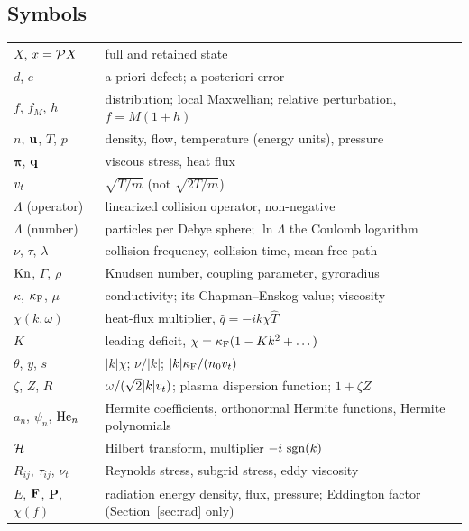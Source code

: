 \subsection{Symbols}

\begin{center}
\renewcommand{\arraystretch}{1.15}
\begin{tabularx}{\textwidth}{@{}P{2.6cm}Y@{}}
\toprule
$X$, $x=\mathcal{P} X$ & full and retained state \\
$d$, $e$ & a priori defect; a posteriori error \\
$f$, $f_M$, $h$ & distribution; local Maxwellian; relative perturbation,
   $f=M(1+h)$ \\
$n$, $\mathbf{u}$, $T$, $p$ & density, flow, temperature (energy units), pressure \\
$\boldsymbol\pi$, $\mathbf{q}$ & viscous stress, heat flux \\
$v_t$ & $\sqrt{T/m}$ (not $\sqrt{2T/m}$) \\
$\Lambda$ (operator) & linearized collision operator, non-negative \\
$\Lambda$ (number) & particles per Debye sphere; $\ln\Lambda$ the Coulomb
   logarithm \\
$\nu$, $\tau$, $\lambda$ & collision frequency, collision time, mean free
   path \\
$\mathrm{Kn}$, $\Gamma$, $\rho$ & Knudsen number, coupling parameter, gyroradius \\
$\kappa$, $\kappa_{\mathrm F}$, $\mu$ & conductivity; its Chapman--Enskog value;
   viscosity \\
$\chi(k,\omega)$ & heat-flux multiplier, $\hat q=-ik\chi\hat T$ \\
$K$ & leading deficit, $\chi=\kappa_{\mathrm F}(1-Kk^2+\dots)$ \\
$\theta$, $y$, $s$ & $|k|\chi$; $\nu/|k|$; $|k|\kappa_{\mathrm F}/(n_0v_t)$ \\
$\zeta$, $Z$, $R$ & $\omega/(\sqrt2|k|v_t)$; plasma dispersion function;
   $1+\zeta Z$ \\
$a_n$, $\psi_n$, $\mathrm{He}_n$ & Hermite coefficients, orthonormal Hermite
   functions, Hermite polynomials \\
$\mathcal{H}$ & Hilbert transform, multiplier $-i\,\operatorname{sgn}(k)$ \\
$R_{ij}$, $\tau_{ij}$, $\nu_t$ & Reynolds stress, subgrid stress, eddy
   viscosity \\
$E$, $\mathbf{F}$, $\mathbf P$, $\chi(f)$ & radiation energy density, flux,
   pressure; Eddington factor (Section~\ref{sec:rad} only) \\
\bottomrule
\end{tabularx}
\end{center}

